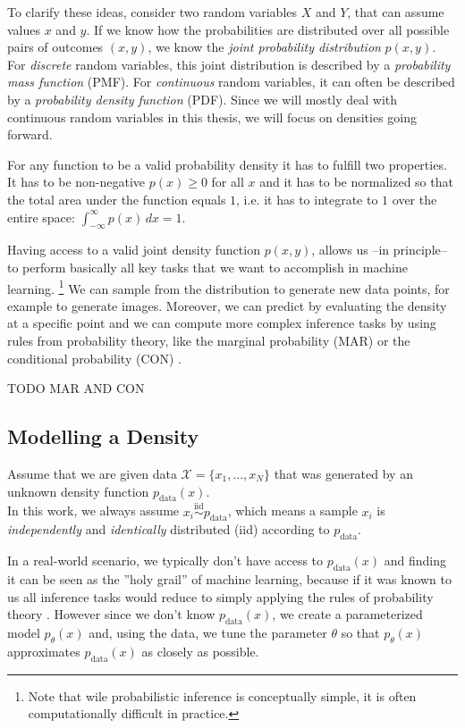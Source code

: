 To clarify these ideas, consider two random variables $X$ and $Y$, that can assume values $x$ and $y$. 
If we know how the probabilities are distributed over all possible pairs of outcomes $(x, y)$, we know the \textit{joint probability distribution} $p(x, y)$.
For \textit{discrete} random variables, this joint distribution is described by a \textit{probability mass function} (PMF). 
For \textit{continuous} random variables, it can often be described by a \textit{probability density function} (PDF).
Since we will mostly deal with continuous random variables in this thesis, we will focus on densities going forward.

For any function to be a valid probability density it has to fulfill two properties. 
It has to be non-negative $p(x) \geq 0$ for all $x$
and it has to be normalized so that the total area under the function equals $1$, i.e. it has to integrate to $1$ over the entire space: $\int_{-\infty}^{\infty} p(x) \, dx = 1$.

Having access to a valid joint density function $p(x, y)$, allows us --in principle-- to perform basically all key tasks that we want to accomplish in machine learning. \footnote{Note that wile probabilistic inference is conceptually simple, it is often computationally difficult in practice.}
We can sample from the distribution to generate new data points, for example to generate images. Moreover, we can predict by evaluating the density at a specific point and 
we can compute more complex inference tasks by using rules from probability theory, like the marginal probability (MAR) or 
the conditional probability (CON) \cite{pc_intro}.

TODO MAR AND CON

\subsection{Modelling a Density}
\label{sec:modelling_a_density}

Assume that we are given data $ \mathcal{X} = \{x_1, ..., x_N\}$ that was generated by an unknown density function $p_{\text{data}}(x)$. \\
In this work, we always assume $x_i \overset{\text{iid}}{\sim} p_{\text{data}}$, which means 
a sample $x_i$ is \emph{independently} and \emph{identically} distributed (iid) according to $p_{\text{data}}$.

In a real-world scenario, we typically don't have access to $p_{\text{data}}(x)$ and finding it can be seen as the ''holy grail'' of machine learning, because if it was known to us all inference tasks would reduce to simply applying the 
rules of probability theory \cite{pc_intro}. However since we don't know $p_{\text{data}}(x)$,
we create a parameterized model $p_\theta(x)$ and, using the data, we tune the parameter $\theta$ so that $p_\theta(x)$ approximates $p_{\text{data}}(x)$ as closely as possible. \\

